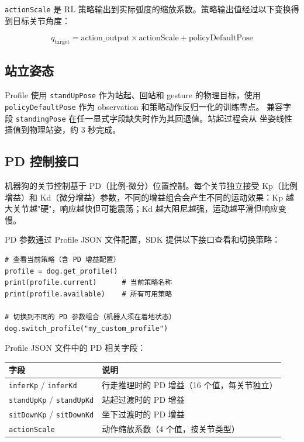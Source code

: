 \documentclass[a4paper,11pt,openany]{book}
\begin{document}
\texttt{actionScale} 是 RL 策略输出到实际弧度的缩放系数。策略输出值经过以下变换得到目标关节角度：

\[
q_{\text{target}} = \text{action\_output} \times \text{actionScale} + \text{policyDefaultPose}
\]

\subsection{站立姿态}

Profile 使用 \texttt{standUpPose} 作为站起、回站和 gesture 的物理目标，使用
\texttt{policyDefaultPose} 作为 observation 和策略动作反归一化的训练零点。
兼容字段 \texttt{standingPose} 在任一显式字段缺失时作为其回退值。站起过程会从
坐姿线性插值到物理站姿，约 3 秒完成。

\subsection{PD 控制接口}

机器狗的关节控制基于 PD（比例-微分）位置控制。每个关节独立接受 Kp（比例增益）和 Kd（微分增益）参数，不同的增益组合会产生不同的运动效果：Kp 越大关节越"硬"，响应越快但可能震荡；Kd 越大阻尼越强，运动越平滑但响应变慢。

PD 参数通过 Profile JSON 文件配置，SDK 提供以下接口查看和切换策略：

\begin{lstlisting}[style=python]
# 查看当前策略（含 PD 增益配置）
profile = dog.get_profile()
print(profile.current)      # 当前策略名称
print(profile.available)    # 所有可用策略

# 切换到不同的 PD 参数组合（机器人须在着地状态）
dog.switch_profile("my_custom_profile")
\end{lstlisting}

Profile JSON 文件中的 PD 相关字段：

\begin{longtable}{lp{10cm}}
\toprule
字段 & 说明 \\
\midrule
\endhead
\texttt{inferKp} / \texttt{inferKd} & 行走推理时的 PD 增益（16 个值，每关节独立） \\
\texttt{standUpKp} / \texttt{standUpKd} & 站起过渡时的 PD 增益 \\
\texttt{sitDownKp} / \texttt{sitDownKd} & 坐下过渡时的 PD 增益 \\
\texttt{actionScale} & 动作缩放系数（4 个值，按关节类型） \\
\bottomrule
\end{longtable}
\end{document}

